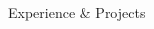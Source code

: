 \documentclass{resume} %
\begin{document}
\begin{rSection}{\large{Experience \& Projects {\href{https://github.com/aritzLizoain}{}}}}
\begin{adjustwidth}{-3.5mm}{0pt}
\begin{itemize}
\end{itemize}
\end{adjustwidth}
    

\end{rSection}



\end{document}
